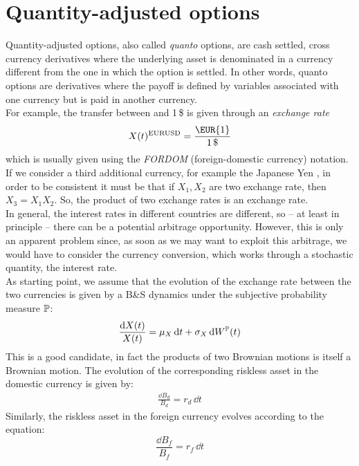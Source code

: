 \section{Quantity-adjusted options} %
Quantity-adjusted options, also called \emph{quanto} options, are cash settled, cross currency derivatives where the underlying asset is denominated in a currency different from the one in which the option is settled. In other words, quanto options are derivatives where the payoff is defined by variables associated with one currency but is paid in another currency. \\
For example, the transfer between  and 1\,\$ is given through an \emph{exchange rate}
\begin{equation}
    X(t)^{\text{EURUSD}} = \dfrac{\text{\EUR{1}}}{1\,\$}
\end{equation}
which is usually given using the \emph{FORDOM} (foreign-domestic currency) notation. If we consider a third additional currency, for example the Japanese Yen \textyen, in order to be consistent it must be that if $X_1, X_2$ are two exchange rate, then $X_3 = X_1X_2$. So, the product of two exchange rates is an exchange rate.\\
In general, the interest rates in different countries are different, so  -- at least in principle -- there can be a potential arbitrage opportunity. However, this is only an apparent problem since, as soon as we may want to exploit this arbitrage, we would have to consider the currency conversion, which works through a stochastic quantity, the interest rate. \\
As starting point, we assume that the evolution of the exchange rate between the two currencies is given by a B\&S dynamics under the subjective probability measure $\mathbb{P}$:
\begin{align}
    \frac{\dd X(t)}{X(t)} = \mu_X\,\dd t + \sigma_X\,\dd W^{\mathbb{P}}(t)
\end{align}
This is a good candidate, in fact the products of two Brownian motions is itself a Brownian motion. The evolution of the corresponding riskless asset in the domestic currency is given by:
\begin{align}\label{dd}
    \frac{\dd B_d}{B_d} = r_d\,\dd t
\end{align}
Similarly, the riskless asset in the foreign currency evolves according to the equation:
\begin{equation}\label{fffffffffffff}
    \frac{\dd B_f}{B_f} = r_f\,\dd t
\end{equation}
